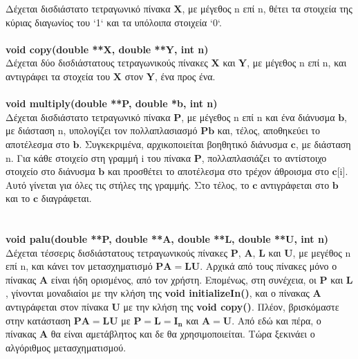 \documentclass[a4paper, 14pt]{article}   %
\begin{document}
	Δέχεται δισδιάστατο τετραγωνικό πίνακα $\mathbf{X}$, με μέγεθος n επί n, θέτει τα στοιχεία της κύριας διαγωνίος του `1` και τα υπόλοιπα στοιχεία `0`.\\\\
\textbf{void copy(double **X, double **Y, int n)}\\
	Δέχεται δύο δισδιάστατους τετραγωνικούς πίνακες $\mathbf{X}$ και $\mathbf{Y}$, με μέγεθος n επί n, και αντιγράφει τα στοχεία του $\mathbf{X}$ στον $\mathbf{Y}$, ένα προς ένα.\\\\
\textbf{void multiply(double **P, double *b, int n)}\\
	Δέχεται δισδιάστατο τετραγωνικό πίνακα $\mathbf{P}$, με μέγεθος n επί n και ένα διάνυσμα $\mathbf{b}$, με διάσταση n, υπολογίζει τον πολλαπλασιασμό $\mathbf{Pb}$ και, τέλος, αποθηκεύει το αποτέλεσμα στο $\mathbf{b}$.  Συγκεκριμένα, αρχικοποιείται βοηθητικό διάνυσμα  $\mathbf{c}$, με διάσταση n. Για κάθε στοιχείο στη γραμμή i του πίνακα  $\mathbf{P}$, πολλαπλασιάζει το αντίστοιχο στοιχείο στο διάνυσμα  $\mathbf{b}$ και προσθέτει το αποτέλεσμα στο τρέχον άθροισμα στο  $\mathbf{c}$[i]. Αυτό γίνεται για όλες τις στήλες της γραμμής. Στο τέλος, το  $\mathbf{c}$ αντιγράφεται στο  $\mathbf{b}$ και το  $\mathbf{c}$ διαγράφεται.\\\\\\
\textbf{void palu(double **P, double **A, double **L, double **U, int n)}\\
	Δέχεται τέσσερις δισδιάστατους τετραγωνικούς πίνακες $\mathbf{P}$, $\mathbf{A}$, $\mathbf{L}$ και $\mathbf{U}$, με μεγέθος n επί n, και κάνει τον μετασχηματισμό $\mathbf{PA = LU}$. Aρχικά από τους πίνακες μόνο ο πίνακας  $\mathbf{A}$ είναι ήδη ορισμένος, από τον χρήστη. Επομένως, στη συνέχεια, οι  $\mathbf{P}$ και  $\mathbf{L}$, γίνονται μοναδιαίοι με την κλήση της \textbf{void initializeIn()}, και ο πίνακας  $\mathbf{A}$ αντιγράφεται στον πίνακα $\mathbf{U}$ με την κλήση της \textbf{void copy()}. Πλέον, βρισκόμαστε στην κατάσταση $\mathbf{PA = LU}$ με $\mathbf{P = L = I_n}$ και $\mathbf{A = U}$. Από εδώ και πέρα, ο πίνακας $\mathbf{A}$ θα είναι αμετάβλητος και δε θα χρησιμοποιείται. Τώρα ξεκινάει ο αλγόριθμος μετασχηματισμού.\\
\end{document}
